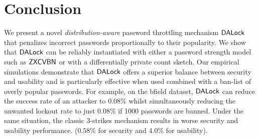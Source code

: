 \vspace*{-\baselineskip}
\section{Conclusion}
We present a novel {\em distribution-aware} password throttling mechanism $\mathsf{DALock}$ that penalizes incorrect passwords proportionally to their popularity. We show that $\mathsf{DALock}$ can be reliably instantiated with either a password strength model such as $\mathsf{ZXCVBN}$ or with a differentially private count sketch. Our empirical simulations demonstrate that $\mathsf{DALock}$ offers a superior balance between security and usability and is particularly effective when used combined with a ban-list of overly popular passwords. For example, on the bfield dataset, $\mathsf{DALock}$ can reduce the success rate of an attacker to $0.08\%$ whilst simultaneously reducing the unwanted lockout rate to just $0.08\%$ if 1000 passwords are banned. Under the same situation, the classic 3-strikes mechanism results in worse security and usability performance. ($0.58\%$ for security and 4.0\% for usability).

